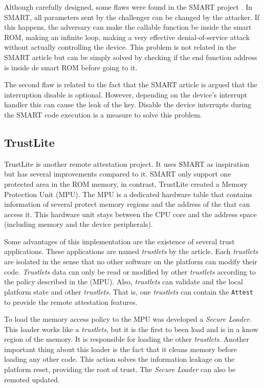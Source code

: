 Although carefully designed, some flaws were found in the SMART project \cite{merda}. In SMART, all parameters sent by the challenger can be changed by the attacker.  If this happens, the adversary can make the callable function be inside the smart ROM, making an infinite loop, making a very effective denial-of-service attack without actually controlling the device. This problem is not related in the SMART article but can be simply solved by checking if the end function address is inside de smart ROM before going to it. 

The second flaw is related to the fact that the SMART article is argued that the interruption disable is optional. However, depending on the device's interrupt handler this can cause the leak of the key. Disable the device interrupts during the SMART code execution is a measure to solve this problem.

\subsection{TrustLite}

TrustLite \cite{tlite} is another remote attestation project. It uses SMART as inspiration but has several improvements compared to it. SMART only support one protected area in the ROM memory, in contrast, TrustLite created a Memory Protection Unit (MPU). The MPU is a dedicated hardware table that contains information of several protect memory regions and the address of the that can access it. This hardware unit stays between the CPU core and the address space (including memory and the device peripherals). 

Some advantages of this implementation are the existence of several trust applications. These applications are named \textit{trustlets} by the article. Each \textit{trustlets} are isolated in the sense that no other software on the platform can modify their code. \textit{Trustlets}  data can only be read or modified by other \textit{trustlets} according to the policy described in the (MPU). Also, \textit{trustlets} can validate and the local platform state and other \textit{trustlets}. That is, one \textit{trustlets} can contain the \verb|Attest| to provide the remote attestation features. 

To load the memory access policy to the MPU was developed a \textit{Secure Loader}. This loader works like a \textit{trustlets}, but it is the first to been load and is in a know region of the memory. It is responsible for loading the other  \textit{trustlets}. Another important thing about this loader is the fact that it cleans memory before loading any other code.  This action solves the information leakage on the platform reset,  providing the root of trust. The \textit{Secure Loader} can also be remoted updated. 

